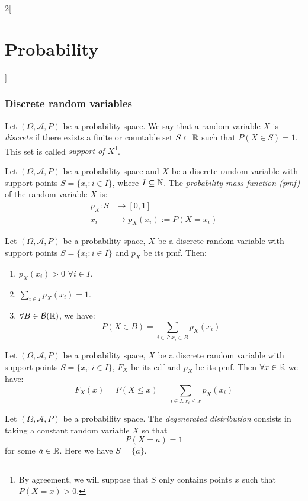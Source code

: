 \documentclass[../../../main.tex]{subfiles}
\begin{document}
\begin{multicols}{2}[\section{Probability}]
  \subsubsection{Discrete random  variables}
  \begin{definition}
    Let $(\Omega,\mathcal{A},P)$ be a probability space. We say that a random variable $X$ is \textit{discrete} if there exists a finite or countable set $S\subset\mathbb{R}$ such that $P(X\in S)=1$. This set is called \textit{support of $X$}\footnote{By agreement, we will suppose that $S$ only contains points $x$ such that $P(X=x)>0$.}.
  \end{definition}
  \begin{definition}
    Let $(\Omega,\mathcal{A},P)$ be a probability space and $X$ be a discrete random variable with support points $S=\{x_i:i\in I\}$, where $I\subseteq\mathbb{N}$. The \textit{probability mass function (pmf)} of the random variable $X$ is:
    \begin{align*}
      p_X:S & \longrightarrow [0,1]          \\
      x_i   & \longmapsto p_X(x_i):=P(X=x_i)
    \end{align*}
  \end{definition}
  \begin{prop}
    Let $(\Omega,\mathcal{A},P)$ be a probability space, $X$ be a discrete random variable with support points $S=\{x_i:i\in I\}$ and $p_X$ be its pmf. Then:
    \begin{enumerate}
      \item $p_X(x_i)>0$ $\forall i\in I$.
      \item $\displaystyle\sum_{i\in I}p_X(x_i)=1$.
      \item $\forall B\in\mathcal{B}(\mathbb{R})$, we have: $$P(X\in B)=\sum_{i\in I:x_i\in B}p_X(x_i)$$
    \end{enumerate}
  \end{prop}
  \begin{corollary}
    Let $(\Omega,\mathcal{A},P)$ be a probability space, $X$ be a discrete random variable with support points $S=\{x_i:i\in I\}$, $F_X$ be its cdf and $p_X$ be its pmf. Then $\forall x\in\mathbb{R}$ we have: $$F_X(x)=P(X\leq x)=\sum_{i\in I:x_i\leq x}p_X(x_i)$$
  \end{corollary}
  \begin{definition}
    Let $(\Omega,\mathcal{A},P)$ be a probability space. The \textit{degenerated distribution} consists in taking a constant random variable $X$ so that $$P(X=a)=1$$ for some $a\in\mathbb{R}$. Here we have $S=\{a\}$.

\end{definition}
\end{multicols}
\end{document}
